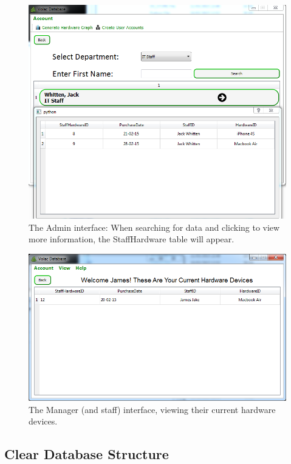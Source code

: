 \begin{figure}[H]
    \includegraphics[width=\textwidth]{./Evaluation/Images/database3.png}
    \caption{The Admin interface: When searching for data and clicking to view more information, the StaffHardware table will appear.} \label{fig:db2}
\end{figure}

\begin{figure}[H]
    \includegraphics[width=\textwidth]{./Evaluation/Images/database2.png}
    \caption{The Manager (and staff) interface, viewing their current hardware devices.} \label{fig:db3}
\end{figure}

\subsection{Clear Database Structure}

